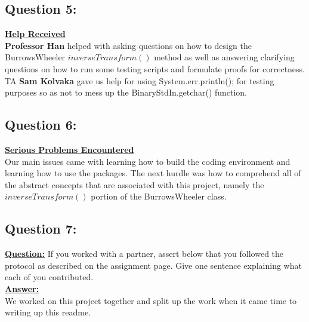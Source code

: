 \documentclass[12pt]{article}
\begin{document}
\subsection{Question 5:}
\underline{\textbf{Help Received}}  \\
\textbf{Professor Han} helped with asking questions on how to design the BurrowsWheeler
$inverseTransform()$ method as well as answering clarifying questions on how to run some
testing scripts and formulate proofs for correctness. TA \textbf{Sam Kolvaka} gave us
help for using System.err.println(); for testing purposes so as not to mess up the
BinaryStdIn.getchar() function.

\subsection{Question 6:}
\underline{\textbf{Serious Problems Encountered}}  \\
Our main issues came with learning how to build the coding environment and learning how
to use the packages. The next hurdle was how to comprehend all of the abstract concepts
that are associated with this project, namely the $inverseTransform()$ portion of the
BurrowsWheeler class.

\subsection{Question 7:}
\underline{\textbf{Question:}}
If you worked with a partner, assert below that you followed the protocol as described on
the assignment page. Give one sentence explaining what each of you contributed. \\
\noindent \underline{\textbf{Answer:}}  \\
We worked on this project together and split up the work when it came time to writing up
this readme.




\end{document}
